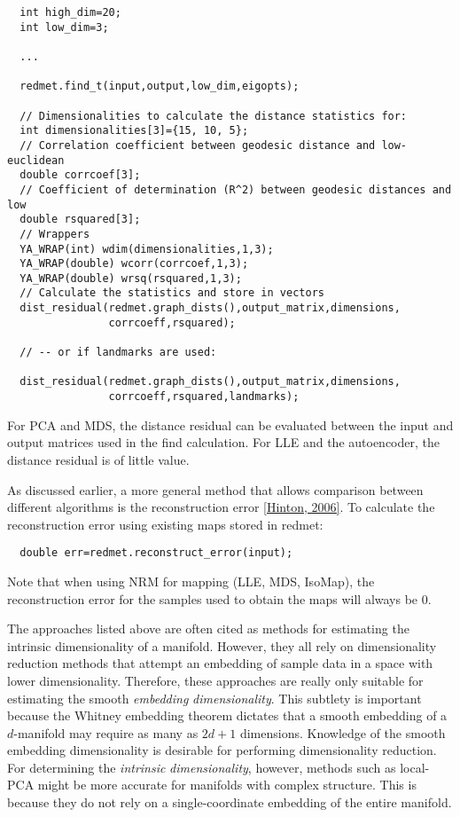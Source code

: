 \footnotesize\begin{verbatim}  int high_dim=20;
  int low_dim=3;
  
  ...
  
  redmet.find_t(input,output,low_dim,eigopts);
  
  // Dimensionalities to calculate the distance statistics for:
  int dimensionalities[3]={15, 10, 5}; 
  // Correlation coefficient between geodesic distance and low-euclidean
  double corrcoef[3];
  // Coefficient of determination (R^2) between geodesic distances and low
  double rsquared[3];
  // Wrappers
  YA_WRAP(int) wdim(dimensionalities,1,3);
  YA_WRAP(double) wcorr(corrcoef,1,3);
  YA_WRAP(double) wrsq(rsquared,1,3);
  // Calculate the statistics and store in vectors
  dist_residual(redmet.graph_dists(),output_matrix,dimensions,
                corrcoeff,rsquared);
                
  // -- or if landmarks are used:
  
  dist_residual(redmet.graph_dists(),output_matrix,dimensions,
                corrcoeff,rsquared,landmarks);  
\end{verbatim}
\normalsize


For PCA and MDS, the distance residual can be evaluated between the input and output matrices used in the find calculation. For LLE and the autoencoder, the distance residual is of little value.

As discussed earlier, a more general method that allows comparison between different algorithms is the reconstruction error \hyperlink{index_ref}{\mbox{[}Hinton, 2006\mbox{]}}. To calculate the reconstruction error using existing maps stored in redmet:



\footnotesize\begin{verbatim}  double err=redmet.reconstruct_error(input);
\end{verbatim}
\normalsize


Note that when using NRM for mapping (LLE, MDS, Iso\-Map), the reconstruction error for the samples used to obtain the maps will always be 0.

The approaches listed above are often cited as methods for estimating the intrinsic dimensionality of a manifold. However, they all rely on dimensionality reduction methods that attempt an embedding of sample data in a space with lower dimensionality. Therefore, these approaches are really only suitable for estimating the smooth {\em embedding\/} {\em dimensionality\/}. This subtlety is important because the Whitney embedding theorem dictates that a smooth embedding of a $d$-manifold may require as many as $2d+1$ dimensions. Knowledge of the smooth embedding dimensionality is desirable for performing dimensionality reduction. For determining the {\em intrinsic\/} {\em dimensionality\/}, however, methods such as local-PCA might be more accurate for manifolds with complex structure. This is because they do not rely on a single-coordinate embedding of the entire manifold.

